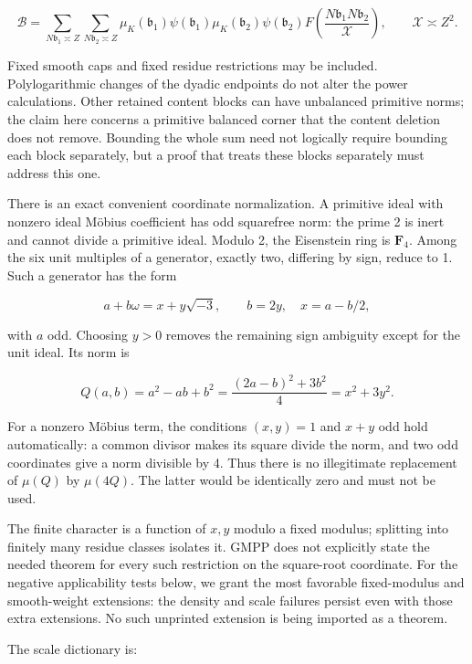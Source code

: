\[
\mathcal B=\sum_{N\mathfrak b_1\asymp Z}
\sum_{N\mathfrak b_2\asymp Z}
\mu_K(\mathfrak b_1)\psi(\mathfrak b_1)
\mu_K(\mathfrak b_2)\psi(\mathfrak b_2)
F\!\left(\frac{N\mathfrak b_1N\mathfrak b_2}{\mathcal X}\right),
\qquad \mathcal X\asymp Z^2.
\tag{5}
\]

Fixed smooth caps and fixed residue restrictions may be included.
Polylogarithmic changes of the dyadic endpoints do not alter the power
calculations. Other retained content blocks can have unbalanced
primitive norms; the claim here concerns a primitive balanced corner
that the content deletion does not remove. Bounding the whole sum need
not logically require bounding each block separately, but a proof that
treats these blocks separately must address this one.

There is an exact convenient coordinate normalization. A primitive ideal
with nonzero ideal Möbius coefficient has odd squarefree norm: the prime
2 is inert and cannot divide a primitive ideal. Modulo 2, the Eisenstein
ring is \(\mathbf F_4\). Among the six unit multiples of a generator,
exactly two, differing by sign, reduce to 1. Such a generator has the
form

\[
a+b\omega=x+y\sqrt{-3},\qquad b=2y,\quad x=a-b/2,
\]

with \(a\) odd. Choosing \(y>0\) removes the remaining sign ambiguity
except for the unit ideal. Its norm is

\[
Q(a,b)=a^2-ab+b^2
=\frac{(2a-b)^2+3b^2}{4}=x^2+3y^2.
\tag{6}
\]

For a nonzero Möbius term, the conditions \((x,y)=1\) and \(x+y\) odd
hold automatically: a common divisor makes its square divide the norm,
and two odd coordinates give a norm divisible by 4. Thus there is no
illegitimate replacement of \(\mu(Q)\) by \(\mu(4Q)\). The latter would
be identically zero and must not be used.

The finite character is a function of \(x,y\) modulo a fixed modulus;
splitting into finitely many residue classes isolates it. GMPP does not
explicitly state the needed theorem for every such restriction on the
square-root coordinate. For the negative applicability tests below, we
grant the most favorable fixed-modulus and smooth-weight extensions: the
density and scale failures persist even with those extra extensions. No
such unprinted extension is being imported as a theorem.

The scale dictionary is:

